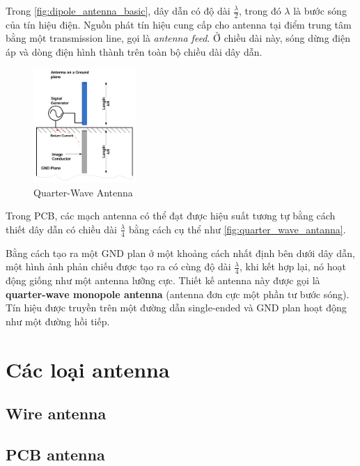         Trong \autoref{fig:dipole_antenna_basic}, dây dẫn có độ dài $\frac{\lambda}{2}$,
        trong đó $\lambda$ là bước sóng của tín hiệu điện.
        Nguồn phát tín hiệu cung cấp cho antenna tại điểm trung tâm
        bằng một transmission line, gọi là \textit{antenna feed}.
        Ở chiều dài này, sóng dừng điện áp và dòng điện hình thành
        trên toàn bộ chiều dài dây dẫn.\par

        \begin{figure}[h]
            \centering
            \includegraphics[width=0.35\textwidth]{figures/quarter_wave_antanna.png}
            \caption{Quarter-Wave Antenna}
            \label{fig:quarter_wave_antanna}
        \end{figure}

        Trong PCB, các mạch antenna có thể đạt được hiệu suất tương tự
        bằng cách thiết dây dẫn có chiều dài $\frac{\lambda}{4}$ bằng cách cụ thể như \autoref{fig:quarter_wave_antanna}.\par

        Bằng cách tạo ra một GND plan ở một khoảng cách nhất định bên dưới dây dẫn,
        một hình ảnh phản chiếu được tạo ra có cùng độ dài $\frac{\lambda}{4}$,
        khi kết hợp lại, nó hoạt động giống như một antenna lưỡng cực.
        Thiết kế antenna này được gọi là \textbf{quarter-wave monopole antenna} (antenna đơn cực một phần tư bước sóng).
        Tín hiệu được truyền trên một đường dẫn single-ended và GND plan hoạt động như một đường hồi tiếp.\par
    
    \section{Các loại antenna}
        \subsection{Wire antenna}
        \subsection{PCB antenna}
